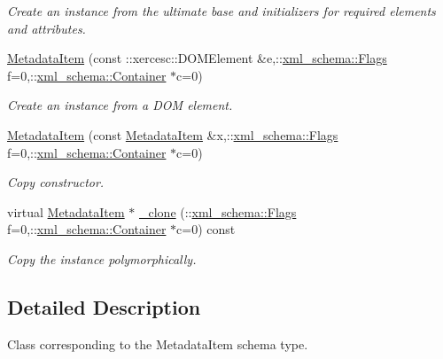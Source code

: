 \begin{DoxyCompactItemize}
\begin{DoxyCompactList}\small\item\em Create an instance from the ultimate base and initializers for required elements and attributes. \item\end{DoxyCompactList}\item 
\hyperlink{classopenstack_1_1xml_1_1MetadataItem_a85371fb9754aa7c38b3c4d25c10bcd46}{MetadataItem} (const ::xercesc::DOMElement \&e,::\hyperlink{namespacexml__schema_affb4c227cbd9aa7453dd1dc5a1401943}{xml\_\-schema::Flags} f=0,::\hyperlink{namespacexml__schema_a333dea2213742aea47a37532dec4ec27}{xml\_\-schema::Container} $\ast$c=0)
\begin{DoxyCompactList}\small\item\em Create an instance from a DOM element. \item\end{DoxyCompactList}\item 
\hyperlink{classopenstack_1_1xml_1_1MetadataItem_a31af02833535e6d979726c2b537abe02}{MetadataItem} (const \hyperlink{classopenstack_1_1xml_1_1MetadataItem}{MetadataItem} \&x,::\hyperlink{namespacexml__schema_affb4c227cbd9aa7453dd1dc5a1401943}{xml\_\-schema::Flags} f=0,::\hyperlink{namespacexml__schema_a333dea2213742aea47a37532dec4ec27}{xml\_\-schema::Container} $\ast$c=0)
\begin{DoxyCompactList}\small\item\em Copy constructor. \item\end{DoxyCompactList}\item 
virtual \hyperlink{classopenstack_1_1xml_1_1MetadataItem}{MetadataItem} $\ast$ \hyperlink{classopenstack_1_1xml_1_1MetadataItem_a1fb35540c47be383ed9e213feb119140}{\_\-clone} (::\hyperlink{namespacexml__schema_affb4c227cbd9aa7453dd1dc5a1401943}{xml\_\-schema::Flags} f=0,::\hyperlink{namespacexml__schema_a333dea2213742aea47a37532dec4ec27}{xml\_\-schema::Container} $\ast$c=0) const 
\begin{DoxyCompactList}\small\item\em Copy the instance polymorphically. \item\end{DoxyCompactList}\end{DoxyCompactItemize}


\subsection{Detailed Description}
Class corresponding to the MetadataItem schema type. 

